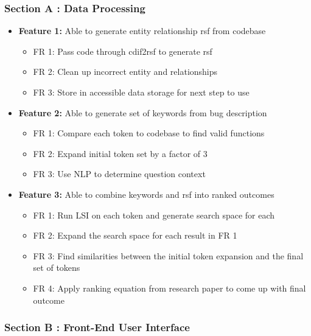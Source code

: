 \documentclass[12pt]{article}
\providecommand{\tightlist}{%
  \setlength{\itemsep}{0pt}\setlength{\parskip}{0pt}}
\begin{document}
\hypertarget{section-a-data-processing}{%
\subsubsection{Section A : Data
Processing}\label{section-a-data-processing}}

\begin{itemize}
\tightlist
\item
  \textbf{Feature 1:} Able to generate entity relationship rsf from
  codebase

  \begin{itemize}
  \tightlist
  \item
    FR 1: Pass code through cdif2rsf to generate rsf
  \item
    FR 2: Clean up incorrect entity and relationships
  \item
    FR 3: Store in accessible data storage for next step to use
  \end{itemize}
\item
  \textbf{Feature 2:} Able to generate set of keywords from bug
  description

  \begin{itemize}
  \tightlist
  \item
    FR 1: Compare each token to codebase to find valid functions
  \item
    FR 2: Expand initial token set by a factor of 3
  \item
    FR 3: Use NLP to determine question context
  \end{itemize}
\item
  \textbf{Feature 3:} Able to combine keywords and rsf into ranked
  outcomes

  \begin{itemize}
  \tightlist
  \item
    FR 1: Run LSI on each token and generate search space for each
  \item
    FR 2: Expand the search space for each result in FR 1
  \item
    FR 3: Find similarities between the initial token expansion and the
    final set of tokens
  \item
    FR 4: Apply ranking equation from research paper to come up with
    final outcome
  \end{itemize}
\end{itemize}

\hypertarget{section-b-front-end-user-interface}{%
\subsubsection{Section B : Front-End User
Interface}\label{section-b-front-end-user-interface}}
\end{document}
